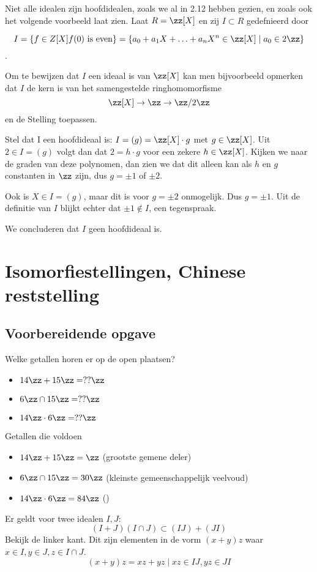 \documentclass[a4paper,12pt,oneside]{book}
\begin{document}
\begin{voorbeeld}
Niet alle idealen zijn hoofdidealen, zoals we al in 2.12 hebben gezien, en zoals ook
het volgende voorbeeld laat zien. Laat $R = \zz[X]$ en zij $I \subset R$ gedefnieerd door

$$I = \{f \in Z[X] f (0) \text{ is even}\} = \{a_0 + a_1 X + \ldots + a_n X^n \in \zz[X] \mid a_0 \in 2\zz \}$$.

Om te bewijzen dat $I$ een ideaal is van $\zz[X]$ kan men bijvoorbeeld opmerken dat $I$ de kern is van het
samengestelde ringhomomorfisme
$$ \zz[X] \to \zz \to \zz/2\zz$$
en de Stelling toepassen.

Stel dat I een hoofdideaal is: $I = (g) = \zz[X] \cdot g$ met $g \in \zz[X]$. Uit $2 \in I = (g)$ volgt dan dat
$2 = h \cdot g$ voor een zekere $h \in \zz[X]$. Kijken we naar de graden van deze polynomen, dan zien we dat
dit alleen kan als $h$ en $g$ constanten in $\zz$ zijn, dus $g = \pm 1$ of $\pm 2$. 

Ook is $X \in I = (g)$, maar dit is voor $g = \pm 2$ onmogelijk. Dus $g = \pm 1$. Uit de definitie van $I$ blijkt echter dat $\pm 1 \not \in I$, een tegenspraak.

We concluderen dat $I$ geen hoofdideaal is.
\end{voorbeeld}


\chapter{Isomorfiestellingen, Chinese reststelling}
\section{Voorbereidende opgave}
Welke getallen horen er op de open plaatsen?
\begin{itemize}
\item $14\zz + 15\zz = ??\zz$
\item $6\zz \cap 15\zz = ??\zz$
\item $14\zz \cdot 6\zz = ??\zz$
\end{itemize}
Getallen die voldoen
\begin{itemize}
\item $14\zz + 15\zz = \zz$ (grootste gemene deler)
\item $6\zz \cap 15\zz = 30\zz$ (kleinste gemeenschappelijk veelvoud)
\item $14\zz \cdot 6\zz = 84\zz$ ()
\end{itemize}

\begin{voorbeeld}
Er geldt voor twee idealen $I,J$:
\[
(I+J)(I \cap J) \subset (IJ)+(JI)
\]
Bekijk de linker kant. Dit zijn elementen in de vorm $(x+y)z$ waar $x \in I, y \in J, z \in I \cap J$.
\[
(x+y)z = xz+yz  \mid xz \in IJ , yz \in JI
\]
\end{voorbeeld}
\end{document}
